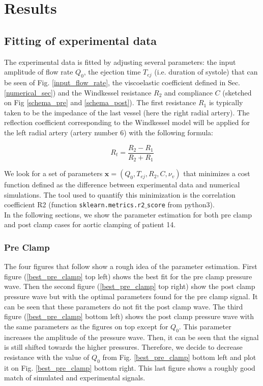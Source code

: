\documentclass{config}
\begin{document}
\section{Results}

\subsection{Fitting of experimental data}

The experimental data is fitted by adjusting several parameters: the input amplitude of flow rate $Q_0$, the ejection time $T_{ej}$ (i.e. duration of systole) that can be seen of Fig. \ref{input_flow_rate}, the viscoelastic coefficient defined in Sec. \ref{numerical_sec}) and the Windkessel resistance $R_2$ and compliance $C$  (sketched on Fig \ref{schema_pre} and \ref{schema_post}). The first resistance $R_1$ is typically taken to be the impedance of the last vessel (here the right radial artery). The reflection coefficient corresponding to the Windkessel model will be applied for the left radial artery (artery number 6) with the following formula:

\begin{equation}\label{reflection_coeff}
R_t = \frac{R_2 - R_1 }{R_2 + R_1}
\end{equation} 

We look for a set of parameters $\mathbf{x} = (Q_0, T_{ej}, R_2, C, \nu_v)$ that minimizes a cost function defined as the difference between experimental data and numerical simulations. The tool used to quantify this minimization is the correlation coefficient R2 (function \texttt{sklearn.metrics.r2$\_$score}  from python3). \\

In the following sections, we show the parameter estimation for both pre clamp and post clamp cases for aortic clamping of patient 14. 

\subsubsection{Pre Clamp}

The four figures that follow show a rough idea of the parameter estimation. First figure (\ref{best_pre_clamp} top left) shows the best fit for the pre clamp pressure wave. Then the second figure (\ref{best_pre_clamp} top right) show the post clamp pressure wave but with the optimal parameters found for the pre clamp signal. It can be seen that these parameters do not fit the post clamp wave. The third figure (\ref{best_pre_clamp} bottom left) shows the post clamp pressure wave with the same parameters as the figures on top except for $Q_0$. This parameter increases the amplitude of the pressure wave. Then, it can be seen that the signal is still shifted towards the higher pressures. Therefore, we decide to decrease resistance with the value of $Q_0$ from Fig. \ref{best_pre_clamp} bottom left and plot it on  Fig. \ref{best_pre_clamp} bottom right. This last figure shows a roughly good match of simulated and experimental signals. 
\end{document}
